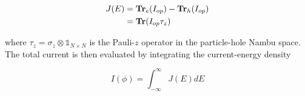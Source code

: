 \begin{equation}
   \begin{aligned}
      J(E) &= \text{\bf{Tr}}_{e}(I_{op})-\text{\bf{Tr}}_{h}(I_{op})	\\
      &= \text{\bf{Tr}}(I_{op}\tau_{z})
   \end{aligned}
\end{equation} 

where $\tau_{z} = \sigma_{z}\otimes  \mathds{1}_{N\times N}$ is the Pauli-$z$ operator in the particle-hole Nambu space. The total current is then evaluated by integrating the current-energy density

\begin{equation}
	I(\phi) = \int_{-\infty}^{\infty}J(E) dE
\end{equation}